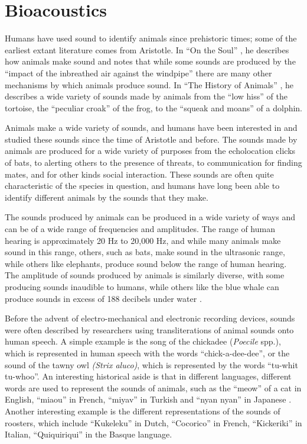 \documentclass[12pt,oneside]{book}
\begin{document}
\section{Bioacoustics}
\label{section:relatedWork:bioacoustics}

Humans have used sound to identify animals since prehistoric times;
some of the earliest extant literature comes from Aristotle.  In ``On
the Soul'' \cite{aristotle1}, he describes how animals make sound and
notes that while some sounds are produced by the ``impact of the
inbreathed air against the windpipe'' there are many other mechanisms
by which animals produce sound.  In ``The History of Animals''
\cite{aristotle2}, he describes a wide variety of sounds made by
animals from the ``low hiss'' of the tortoise, the ``peculiar croak''
of the frog, to the ``squeak and moans'' of a dolphin.

Animals make a wide variety of sounds, and humans have been interested
in and studied these sounds since the time of Aristotle and before.
The sounds made by animals are produced for a wide variety of purposes
from the echolocation clicks of bats, to alerting others to the
presence of threats, to communication for finding mates, and for other
kinds social interaction.  These sounds are often quite characteristic
of the species in question, and humans have long been able to identify
different animals by the sounds that they make.

The sounds produced by animals can be produced in a wide variety of
ways and can be of a wide range of frequencies and amplitudes.  The
range of human hearing is approximately 20 Hz to 20,000 Hz,
\cite{lyon1990cochlear} and while many animals make sound in this
range, others, such as bats, make sound in the ultrasonic range, while
others like elephants, produce sound below the range of human hearing.
The amplitude of sounds produced by animals is similarly diverse, with
some producing sounds inaudible to humans, while others like the blue
whale can produce sounds in excess of 188 decibels under water
\cite{clark2006acoustic}.

Before the advent of electro-mechanical and electronic recording
devices, sounds were often described by researchers using
transliterations of animal sounds onto human speech.  A simple example
is the song of the chickadee (\textit{Poecile} spp.), which is
represented in human speech with the words ``chick-a-dee-dee'', or the
sound of the tawny owl \textit{(Strix aluco)}, which is represented by
the words ``tu-whit tu-whoo''.  An interesting historical aside is
that in different languages, different words are used to represent the
sounds of animals, such as the ``meow'' of a cat in English, ``miaou''
in French, ``miyav'' in Turkish and ``nyan nyan'' in Japanese
\cite{weiss2011animals}.  Another interesting example is the different
representations of the sounds of roosters, which include ``Kukeleku''
in Dutch, ``Cocorico'' in French, ``Kickeriki'' in Italian,
``Quiquiriqui'' in the Basque language.
\end{document}
